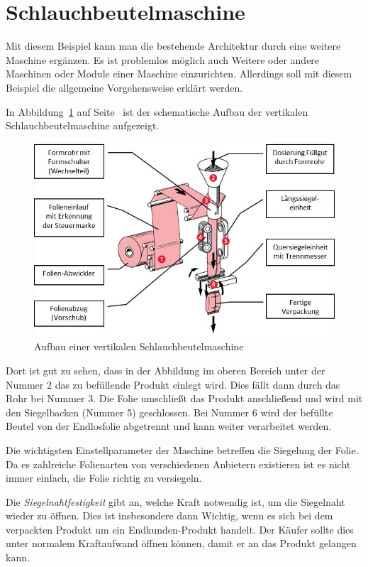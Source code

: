 \section{Schlauchbeutelmaschine}
Mit diesem Beispiel kann man die bestehende Architektur durch eine weitere Maschine ergänzen. Es ist problemlos möglich
auch Weitere oder andere Maschinen oder Module einer Maschine einzurichten. Allerdings soll mit diesem Beispiel die
allgemeine Vorgehensweise erklärt werden.

In Abbildung~\ref{fig:siegelmaschinen_vffs} auf Seite~\pageref{fig:siegelmaschinen_vffs} ist der schematische Aufbau der
vertikalen Schlauchbeutelmaschine aufgezeigt.

\begin{figure}[h]
    \centering
    \includegraphics[scale=1]{images/kapitel_5/vffs.jpg}
    \caption{Aufbau einer vertikalen Schlauchbeutelmaschine~\cite{online_grundlagen_boschkwe}}
    \label{fig:siegelmaschinen_vffs}
\end{figure}

Dort ist gut zu sehen, dass in der Abbildung im oberen Bereich unter der Nummer 2 das zu befüllende Produkt einlegt
wird. Dies fällt dann durch das Rohr bei Nummer 3. Die Folie umschließt das Produkt anschließend und wird mit den
Siegelbacken (Nummer 5) geschlossen. Bei Nummer 6 wird der befüllte Beutel von der Endlosfolie abgetrennt und kann
weiter verarbeitet werden.

Die wichtigsten Einstellparameter der Maschine betreffen die Siegelung der Folie. Da es zahlreiche Folienarten von
verschiedenen Anbietern existieren ist es nicht immer einfach, die Folie richtig zu versiegeln.

Die \textit{Siegelnahtfestigkeit} gibt an, welche Kraft notwendig ist, um die Siegelnaht wieder zu öffnen. Dies ist
insbesondere dann Wichtig, wenn es sich bei dem verpackten Produkt um ein Endkunden-Produkt handelt. Der Käufer sollte
dies unter normalem Kraftaufwand öffnen können, damit er an das Produkt gelangen kann.

